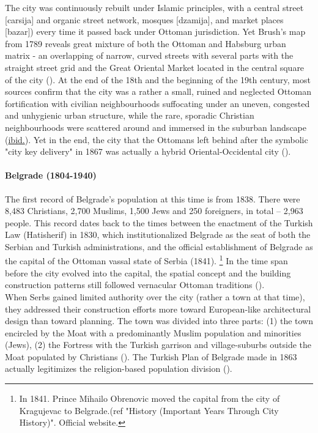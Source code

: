 \documentclass[11pt]{report}
\begin{document}
{{{{The city was continuously rebuilt under Islamic principles, with a central street [carsija] and organic street network, mosques [dzamija], and market places [bazar]) every time it passed back under Ottoman jurisdiction.
Yet Brush’s map from 1789 reveals great mixture of both the Ottoman and Habsburg urban matrix - an overlapping of narrow, curved streets with several parts with the straight street grid and the Great Oriental Market located in the central square of the city (\href{Doytchinov}{\citealt{doytchinov_modernization_2015}}).
At the end of the 18th and the beginning of the 19th century, most sources confirm that the city was a rather a small, ruined and neglected Ottoman fortification with civilian neighbourhoods suffocating under an uneven, congested and unhygienic urban structure, while the rare, sporadic Christian neighbourhoods were scattered around and immersed in the suburban landscape (\href{ref}{ibid.}).
Yet in the end, the city that the Ottomans left behind after the symbolic "city key delivery" in 1867 was actually a hybrid Oriental-Occidental city (\href{Blagojevic}{\citealt{blagojevic_urban_2009}}).

\paragraph{Belgrade (1804-1940)}

The first record of Belgrade’s population at this time is from 1838. There were 8,483 Christians, 2,700 Muslims, 1,500 Jews and 250 foreigners, in total – 2,963 people. This record dates back to the times between the enactment of the Turkish Law (Hatisherif) in 1830, which institutionalized Belgrade as the seat of both the Serbian and Turkish administrations, and the official establishment of Belgrade as the capital of the Ottoman vassal state of Serbia (1841).
\footnote{In 1841. Prince Mihailo Obrenovic moved the capital from the city of Kragujevac to Belgrade.(ref "History (Important Years Through City History)". Official website.}
In the time span before the city evolved into the capital, the spatial concept and the building construction patterns still followed vernacular Ottoman traditions (\href{Doytchinov}{\citealt{doytchinov_modernization_2015}}).
\\

When Serbs gained limited authority over the city (rather a town at that time), they addressed their construction efforts more toward European-like architectural design than toward planning. The town was divided into three parts: (1) the town encircled by the Moat with a predominantly Muslim population and minorities (Jews), (2) the Fortress with the Turkish garrison and village-suburbs outside the Moat populated by Christians (\href{Blagojevic}{\citealt{blagojevic_urban_2009}}).
The Turkish Plan of Belgrade made in 1863 actually legitimizes the religion-based population division (\href{Roter}{\citealt{doytchinov_modernization_2015}}).
\\

}}}}
\end{document}

